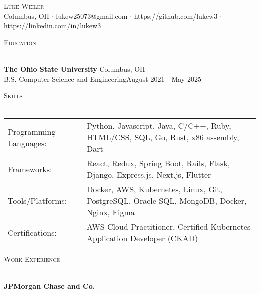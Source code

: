 \documentclass[letterpaper]{article}
\newcommand{\lineunder} {
    \vspace*{-8pt} \\
    \hspace*{-18pt} \hrulefill \\
}
\newcommand{\header} [1] {
    {\hspace*{-18pt}\vspace*{6pt} \textsc{#1}}
    \vspace*{-6pt} \lineunder
}
\begin{document}
\vspace*{-40pt}

\vspace*{-10pt}
\begin{center}
	{\Huge \scshape {Luke Weiler}}\\
	Columbus, OH $\cdot$ lukew25073@gmail.com $\cdot$ https://github.com/lukew3 $\cdot$ https://linkedin.com/in/lukew3\\
\end{center}

\header{Education}
\vspace{1mm}

    \textbf{The Ohio State University} \hfill Columbus, OH\\
    B.S. Computer Science and Engineering\hfill \hfill August 2021 - May 2025\\
    \vspace{2mm}


\header{Skills}
\vspace{1.5mm}
\hspace{-3mm}
\begin{tabular}{ l l }

    Programming Languages:   & Python, Javascript, Java, C/C++, Ruby, HTML/CSS, SQL, Go, Rust, x86 assembly, Dart  \\

    Frameworks:   & React, Redux, Spring Boot, Rails, Flask, Django, Express.js, Next.js, Flutter  \\

    Tools/Platforms:   & Docker, AWS, Kubernetes, Linux, Git, PostgreSQL, Oracle SQL, MongoDB, Docker, Nginx, Figma  \\

    Certifications:   & AWS Cloud Practitioner, Certified Kubernetes Application Developer (CKAD)  \\

\end{tabular}
\vspace{2mm}

\header{Work Experience}
\vspace{1mm}

    \textbf{JPMorgan Chase and Co.}\\
    
\end{document}
